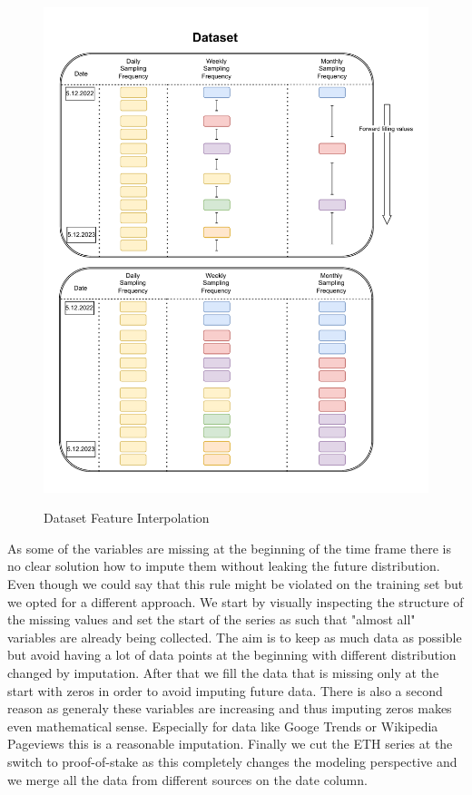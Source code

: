 \begin{figure}[!h]
    \centering
    \caption{Dataset Feature Interpolation}
        \includegraphics[width=1\textwidth]{Figures/data_interpolation.drawio.pdf}
    \label{fig:dataset_interpolation}
\end{figure}

As some of the variables are missing at the beginning of the time frame there
is no clear solution how to impute them without leaking the future distribution.
Even though we could say that this rule might be violated on the training set
but we opted for a different approach.
We start by visually inspecting the structure of the missing values and 
set the start of the series as such that "almost all" variables are already 
being collected. The aim is to keep as much data as possible but avoid
having a lot of data points at the beginning with different distribution changed 
by imputation. After that we fill the data that is missing only at the start with
zeros in order to avoid imputing future data. There is also a second reason
as generaly these variables are increasing and thus imputing zeros makes 
even mathematical sense. Especially for data like Googe Trends or Wikipedia
Pageviews this is a reasonable imputation. Finally we cut the 
\ac{ETH} series at the switch to proof-of-stake as this completely
changes the modeling perspective and we merge all the data
from different sources on the date column.


